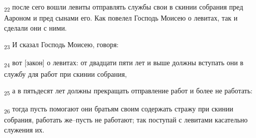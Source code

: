 \begin{tcolorbox}
\textsubscript{22} после сего вошли левиты отправлять службы свои в скинии собрания пред Аароном и пред сынами его. Как повелел Господь Моисею о левитах, так и сделали они с ними.
\end{tcolorbox}
\begin{tcolorbox}
\textsubscript{23} И сказал Господь Моисею, говоря:
\end{tcolorbox}
\begin{tcolorbox}
\textsubscript{24} вот [закон] о левитах: от двадцати пяти лет и выше должны вступать они в службу для работ при скинии собрания,
\end{tcolorbox}
\begin{tcolorbox}
\textsubscript{25} а в пятьдесят лет должны прекращать отправление работ и более не работать:
\end{tcolorbox}
\begin{tcolorbox}
\textsubscript{26} тогда пусть помогают они братьям своим содержать стражу при скинии собрания, работать же--пусть не работают; так поступай с левитами касательно служения их.
\end{tcolorbox}
